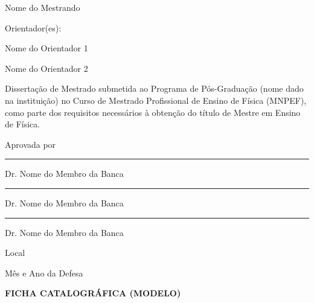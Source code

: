\documentclass[a4paper,12pt,oneside]{book}
\begin{document}
\vspace{0.5cm}	

\begin{center}
	Nome do Mestrando
\end{center}

\vspace{0.5cm}

\begin{center}
Orientador(es):

Nome do Orientador 1

Nome do Orientador 2  
\end{center} 

\vspace{1.0cm}

\begin{center} \justifying
\noindent Dissertação de Mestrado submetida ao Programa de Pós-Graduação (nome dado na instituição) no Curso de Mestrado Profissional de Ensino de Física (MNPEF), como parte dos requisitos necessários à obtenção do título de Mestre em Ensino de Física.
\end{center}

\vspace{0.5cm}

\noindent Aprovada por

\vspace{2cm}

\hfill \parbox{8.5cm} {\rule{9cm}{1pt} %
	
Dr. Nome do Membro da Banca

\vspace{1.0cm}

\rule{9cm}{1pt} %

Dr. Nome do Membro da Banca

\vspace{1.0cm}

\rule{9cm}{1pt} %

Dr. Nome do Membro da Banca}
\vfill

\vspace{2.0cm}

\begin{center}
	Local
	
	Mês e Ano da Defesa
\end{center}

\pagestyle{plain}
\setcounter{page}{2} %
\newpage
\begin{center}
\textbf{FICHA CATALOGRÁFICA (MODELO)}
\end{center}
\end{document}
